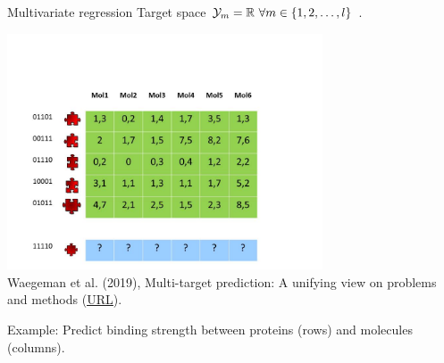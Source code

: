 \documentclass[11pt,compress,t,notes=noshow, xcolor=table]{beamer}
\begin{document}
\begin{frame}{Multivariate regression}
     Target space $\mathcal{Y}_m = \mathbb{R} \  \forall m \in \{1, 2, \ldots, l\}$ . 


        

            \begin{center} 	
            \includegraphics[width=0.7\textwidth,trim = 0 0 100 100,clip]{figure/Slide1} 	\tiny
            \\ Waegeman et al. (2019), Multi-target prediction:
            A unifying view on problems and methods (\href{https://arxiv.org/pdf/1809.02352.pdf}{\underline{URL}}).

            \end{center}

	Example: Predict binding strength between proteins (rows) and molecules (columns).
%
\end{frame}
\end{document}
